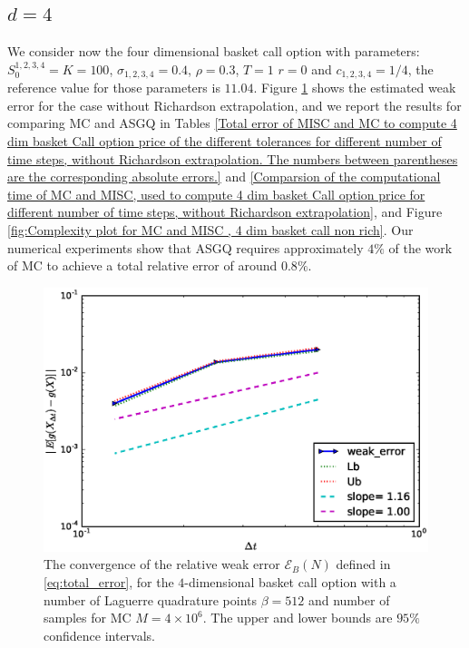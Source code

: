 \subsection{$d=4$}
We consider now  the four dimensional basket call option  with parameters:  $S_0^{1,2,3,4}=K=100$, $\sigma_{1,2,3,4}=0.4$, $\rho=0.3$, $T=1$ $r=0$ and $c_{1,2,3,4}=1/4$, the reference value for those parameters  is  $11.04$. Figure \ref{fig:Weak_rate_4_dim_basket} shows the estimated   weak error  for the case without Richardson extrapolation, and we report the results for comparing MC and ASGQ in Tables \ref{Total error of MISC and MC to compute 4 dim basket  Call option price of the different tolerances for different number of time steps, without Richardson extrapolation. The numbers between parentheses are the corresponding absolute errors.} and \ref{Comparsion of the computational time of  MC and MISC, used to compute 4 dim basket Call option price  for different number of time steps, without Richardson extrapolation}, and Figure \ref{fig:Complexity plot for MC and MISC , 4 dim basket call non rich}.  Our numerical experiments show that ASGQ  requires approximately $4\%$ of the work of MC  to achieve a total relative error of around $0.8\%$.

\FloatBarrier
\begin{figure}[h!]
		\centering
		\includegraphics[width=0.4\linewidth]{./figures/basket_call_4d_time_stepping/weak_convergence/weak_convergence_order_basket_option_4d_relative_M_4_10_6_beta_256}

	\caption{The convergence of the relative weak error  $\mathcal{E}_B(N)$ defined in \ref{eq:total_error}, for the $4$-dimensional basket call option with  a number of Laguerre  quadrature points  $\beta=512$ and number of samples for MC $M=4 \times 10^6$. The upper and lower bounds are $95\%$ confidence intervals.}
	\label{fig:Weak_rate_4_dim_basket}
\end{figure}
\FloatBarrier

